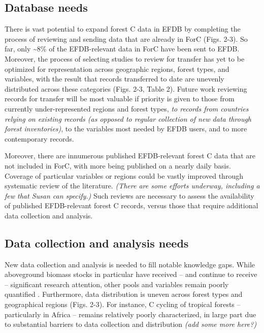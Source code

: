 \documentclass[, manuscript]{copernicus}
\begin{document}
\subsection{Database needs}

There is vast potential to expand forest C data in EFDB by completing
the process of reviewing and sending data that are already in ForC
(Figs. 2-3). So far, only \textasciitilde8\% of the EFDB-relevant data
in ForC have been sent to EFDB. Moreover, the process of selecting
studies to review for transfer has yet to be optimized for
representation across geographic regions, forest types, and variables,
with the result that records transferred to date are unevenly
distributed across these categories (Figs. 2-3, Table 2). Future work
reviewing records for transfer will be most valuable if priority is
given to those from currently under-represented regions and forest
types, \emph{to records from countries relying on existing records (as
opposed to regular collection of new data through forest inventories)},
to the variables most needed by EFDB users, and to more contemporary
records.

Moreover, there are innumerous published EFDB-relevant forest C data
that are not included in ForC, with more being published on a nearly
daily basis. Coverage of particular variables or regions could be vastly
improved through systematic review of the literature. \emph{(There are
some efforts underway, including a few that Susan can specify.)} Such
reviews are necessary to assess the availability of published
EFDB-relevant forest C records, versus those that require additional
data collection and analysis.

\subsection{Data collection and analysis needs}

New data collection and analysis is needed to fill notable knowledge
gaps. While aboveground biomass stocks in particular have received --
and continue to receive -- significant research attention, other pools
and variables remain poorly quantified \citep[Table
2,][]{anderson-teixeira_carbon_2021}. Furthermore, data distribution is
uneven across forest types and geographical regions (Figs. 2-3). For
instance, C cycling of tropical forests -- particularly in Africa --
remains relatively poorly characterized, in large part due to
substantial barriers to data collection and distribution
\citep{delima_making_2022} \emph{(add some more here?)}
\end{document}
